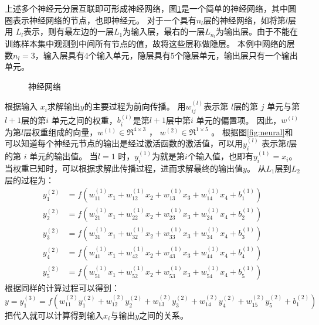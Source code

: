 上述多个神经元分层互联即可形成神经网络，图\ref{fig:network}是一个简单的神经网络，其中圆圈表示神经网络的节点，也即神经元。
对于一个具有$n_l$层的神经网络，如将第$ l $层用 $ L_l$表示，则有最左边的一层$  L_1$为输入层，最右的一层$ L_{n_l} $为输出层。由于不能在训练样本集中观测到中间所有节点的值，故将这些层称做隐层。
本例中网络的层数$ n_l=3$，输入层具有4个输入单元，隐层具有5个隐层单元，输出层只有一个输出单元。

\begin{figure}[hbt]
  \centering
  \sWuhao
  
  \caption{神经网络}
  \label{fig:network}
\end{figure}

根据输入 $x_i$求解输出$y$的主要过程为前向传播。
用$ w^{(l)}_{ij}$表示第 $ l $层的第 $ j$ 单元与第 $ l+1 $层的第$  i$ 单元之间的权重，$ b^{(l)}_i $是第$  l+1 $层中第$  i$ 单元的偏置项。
因此，$w^{(l)}$为第$l$层权重组成的向量，$ w^{(1)} \in \Re^{4\times 3}$ ， $ w^{(2)} \in \Re^{1\times 5}$ 。
根据图\ref{fig:neural}和可以知道每个神经元节点的输出是经过激活函数的激活值，可以用$ y^{(l)}_i$ 表示第$  l $层的第 $ i$ 单元的输出值。
当$  l=1$ 时，$  y^{(1)}_i$为就是第$  i $个输入值，也即有$  y^{(1)}_i = x_i $。
当权重已知时，可以根据求解此传播过程，进而求解最终的输出值$y$。
从$L_1$层到$L_2$层的过程为：
\begin{align}
  y_1^{(2)} &= f(w_{11}^{(1)}x_1 + w_{12}^{(1)} x_2 + w_{13}^{(1)} x_3 + w_{14}^{(1)} x_4 + b_1^{(1)})  \\
  y_2^{(2)} &= f(w_{21}^{(1)}x_1 + w_{22}^{(1)} x_2 + w_{23}^{(1)} x_3 + w_{24}^{(1)} x_4 + b_2^{(1)})  \\
  y_3^{(2)} &= f(w_{31}^{(1)}x_1 + w_{32}^{(1)} x_2 + w_{33}^{(1)} x_3 + w_{34}^{(1)} x_4 + b_3^{(1)})  
\end{align}
\begin{align}
  y_4^{(2)} &= f(w_{41}^{(1)}x_1 + w_{42}^{(1)} x_2 + w_{43}^{(1)} x_3 + w_{44}^{(1)} x_4 + b_4^{(1)})  \\
  y_5^{(2)} &= f(w_{51}^{(1)}x_1 + w_{52}^{(1)} x_2 + w_{53}^{(1)} x_3 + w_{54}^{(1)} x_4 + b_5^{(1)})
  \label{equ:fp1}
\end{align}
根据同样的计算过程可以得到：
\begin{equation}
  y = y_1^{(3)} =  f(w_{11}^{(2)} y_1^{(2)} + w_{12}^{(2)} y_2^{(2)} + w_{13}^{(2)} y_3^{(2)} + w_{14}^{(2)} y_4^{(2)} + w_{15}^{(2)} y_5^{(2)} + b_1^{(2)})
  \label{equ:fp2}
\end{equation}
把代入就可以计算得到输入$x_i$与输出$y$之间的关系。
